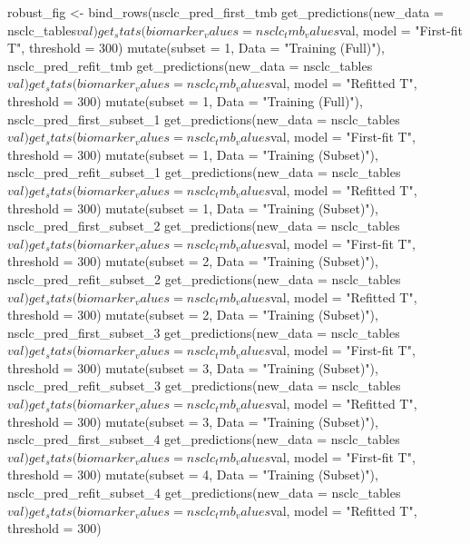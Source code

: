 {robust_fig <- bind_rows(nsclc_pred_first_tmb %
            get_predictions(new_data = nsclc_tables$val) %
            get_stats(biomarker_values = nsclc_tmb_values$val, model = "First-fit T", threshold = 300) %
            mutate(subset = 1, Data = "Training (Full)"),
          nsclc_pred_refit_tmb %
            get_predictions(new_data = nsclc_tables$val) %
            get_stats(biomarker_values = nsclc_tmb_values$val, model = "Refitted T", threshold = 300) %
            mutate(subset = 1, Data = "Training (Full)"),
          nsclc_pred_first_subset_1 %
            get_predictions(new_data = nsclc_tables$val) %
            get_stats(biomarker_values = nsclc_tmb_values$val, model = "First-fit T", threshold = 300) %
            mutate(subset = 1, Data = "Training (Subset)"),
          nsclc_pred_refit_subset_1 %
            get_predictions(new_data = nsclc_tables$val) %
            get_stats(biomarker_values = nsclc_tmb_values$val, model = "Refitted T", threshold = 300) %
            mutate(subset = 1, Data = "Training (Subset)"),
          nsclc_pred_first_subset_2 %
            get_predictions(new_data = nsclc_tables$val) %
            get_stats(biomarker_values = nsclc_tmb_values$val, model = "First-fit T", threshold = 300) %
            mutate(subset = 2, Data = "Training (Subset)"),
          nsclc_pred_refit_subset_2 %
            get_predictions(new_data = nsclc_tables$val) %
            get_stats(biomarker_values = nsclc_tmb_values$val, model = "Refitted T", threshold = 300) %
            mutate(subset = 2, Data = "Training (Subset)"),
          nsclc_pred_first_subset_3 %
            get_predictions(new_data = nsclc_tables$val) %
            get_stats(biomarker_values = nsclc_tmb_values$val, model = "First-fit T", threshold = 300) %
            mutate(subset = 3, Data = "Training (Subset)"),
          nsclc_pred_refit_subset_3 %
            get_predictions(new_data = nsclc_tables$val) %
            get_stats(biomarker_values = nsclc_tmb_values$val, model = "Refitted T", threshold = 300) %
            mutate(subset = 3, Data = "Training (Subset)"),
          nsclc_pred_first_subset_4 %
            get_predictions(new_data = nsclc_tables$val) %
            get_stats(biomarker_values = nsclc_tmb_values$val, model = "First-fit T", threshold = 300) %
            mutate(subset = 4, Data = "Training (Subset)"),
          nsclc_pred_refit_subset_4 %
            get_predictions(new_data = nsclc_tables$val) %
            get_stats(biomarker_values = nsclc_tmb_values$val, model = "Refitted T", threshold = 300) %
}
